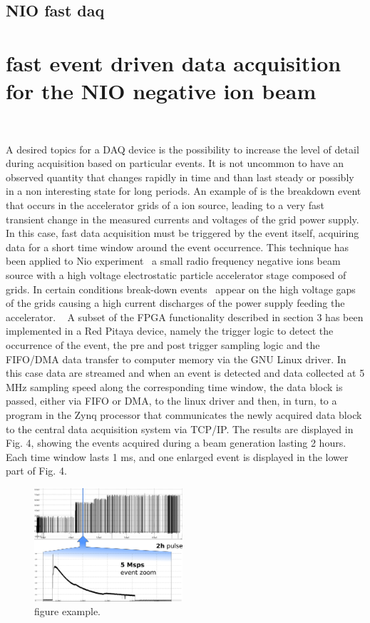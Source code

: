 \subsection{NIO fast daq}
\section{fast event driven data acquisition for the NIO negative ion beam}
~

A desired topics for a DAQ device is the possibility to increase the level of detail during acquisition based on particular events. It is not uncommon to have an observed quantity that changes rapidly in time and than last steady or possibly in a non interesting state for long periods. An example of is the breakdown event that occurs in the accelerator grids of a ion source, leading to a very fast transient change in the measured currents and voltages of the grid power supply. In this case, fast data acquisition must be triggered by the event itself, acquiring data for a short time window around the event occurrence. This technique has been applied to Nio experiment~\cite{DEMURI2015249} a small radio frequency negative ions beam source with a high voltage electrostatic particle accelerator stage composed of grids. In certain conditions break-down events~\cite{RECCHIA20111545} appear on the high voltage gaps of the grids causing a  high current discharges of the power supply feeding the accelerator. 
~
A subset of the FPGA functionality described in section 3 has been implemented in a Red Pitaya device, namely the trigger logic to detect the occurrence of the event, the pre and post trigger sampling logic and the FIFO/DMA data transfer to computer memory via the GNU Linux driver. In this case data are streamed and when an event is detected and data collected at 5 MHz sampling speed along the corresponding time window, the data block is passed, either via FIFO or DMA, to the linux driver and then, in turn, to a program in the Zynq processor that communicates the newly acquired data block to the central data acquisition system via TCP/IP. The results are displayed in Fig. 4, showing the events acquired during a beam generation lasting 2 hours. Each time window lasts 1 ms, and one enlarged event is  displayed in the lower part of Fig. 4.    
\begin{figure}
\centering
\includegraphics[width=0.49\textwidth]{img/4_EmbeddedML/nio12b.png}
\caption{figure example.}
\label{fig:nio}
\end{figure}


